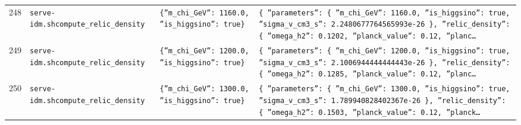 \documentclass[11pt,a4paper]{article}
\begin{document}
\begin{longtable}{@{}p{}p{}p{}p{}@{}}
248 & \texttt{serve-idm.sh}\newline\texttt{compute\_\allowbreak{}relic\_\allowbreak{}density} & \texttt{\{''m\_\allowbreak{}chi\_\allowbreak{}GeV'':\allowbreak{} 1160.0,\allowbreak{} ''is\_\allowbreak{}higgsino'':\allowbreak{} true\}\allowbreak{}} & \texttt{\{   ''parameters'':\allowbreak{} \{     ''m\_\allowbreak{}chi\_\allowbreak{}GeV'':\allowbreak{} 1160.0,\allowbreak{}     ''is\_\allowbreak{}higgsino'':\allowbreak{} true,\allowbreak{}     ''sigma\_\allowbreak{}v\_\allowbreak{}cm3\_\allowbreak{}s'':\allowbreak{} 2.2480677764565993e-26   \}\allowbreak{},\allowbreak{}   ''relic\_\allowbreak{}density'':\allowbreak{} \{     ''omega\_\allowbreak{}h2'':\allowbreak{} 0.1202,\allowbreak{}     ''planck\_\allowbreak{}value'':\allowbreak{} 0.12,\allowbreak{}     ''planc\ldots{}\allowbreak{}} \\
249 & \texttt{serve-idm.sh}\newline\texttt{compute\_\allowbreak{}relic\_\allowbreak{}density} & \texttt{\{''m\_\allowbreak{}chi\_\allowbreak{}GeV'':\allowbreak{} 1200.0,\allowbreak{} ''is\_\allowbreak{}higgsino'':\allowbreak{} true\}\allowbreak{}} & \texttt{\{   ''parameters'':\allowbreak{} \{     ''m\_\allowbreak{}chi\_\allowbreak{}GeV'':\allowbreak{} 1200.0,\allowbreak{}     ''is\_\allowbreak{}higgsino'':\allowbreak{} true,\allowbreak{}     ''sigma\_\allowbreak{}v\_\allowbreak{}cm3\_\allowbreak{}s'':\allowbreak{} 2.1006944444444443e-26   \}\allowbreak{},\allowbreak{}   ''relic\_\allowbreak{}density'':\allowbreak{} \{     ''omega\_\allowbreak{}h2'':\allowbreak{} 0.1285,\allowbreak{}     ''planck\_\allowbreak{}value'':\allowbreak{} 0.12,\allowbreak{}     ''planc\ldots{}\allowbreak{}} \\
250 & \texttt{serve-idm.sh}\newline\texttt{compute\_\allowbreak{}relic\_\allowbreak{}density} & \texttt{\{''m\_\allowbreak{}chi\_\allowbreak{}GeV'':\allowbreak{} 1300.0,\allowbreak{} ''is\_\allowbreak{}higgsino'':\allowbreak{} true\}\allowbreak{}} & \texttt{\{   ''parameters'':\allowbreak{} \{     ''m\_\allowbreak{}chi\_\allowbreak{}GeV'':\allowbreak{} 1300.0,\allowbreak{}     ''is\_\allowbreak{}higgsino'':\allowbreak{} true,\allowbreak{}     ''sigma\_\allowbreak{}v\_\allowbreak{}cm3\_\allowbreak{}s'':\allowbreak{} 1.789940828402367e-26   \}\allowbreak{},\allowbreak{}   ''relic\_\allowbreak{}density'':\allowbreak{} \{     ''omega\_\allowbreak{}h2'':\allowbreak{} 0.1503,\allowbreak{}     ''planck\_\allowbreak{}value'':\allowbreak{} 0.12,\allowbreak{}     ''planck\ldots{}\allowbreak{}} \\

\end{longtable}
\end{document}
